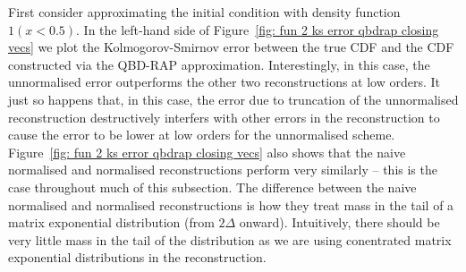 First consider approximating the initial condition with density function \(1(x<0.5)\). In the left-hand side of Figure~\ref{fig: fun 2 ks error qbdrap closing vecs} we plot the Kolmogorov-Smirnov error between the true CDF and the CDF constructed via the QBD-RAP approximation. Interestingly, in this case, the unnormalised error outperforms the other two reconstructions at low orders. It just so happens that, in this case, the error due to truncation of the unnormalised reconstruction destructively interfers with other errors in the reconstruction to cause the error to be lower at low orders for the unnormalised scheme. Figure~\ref{fig: fun 2 ks error qbdrap closing vecs} also shows that the naive normalised and normalised reconstructions perform very similarly -- this is the case throughout much of this subsection. The difference between the naive normalised and normalised reconstructions is how they treat mass in the tail of a matrix exponential distribution (from \(2\Delta\) onward). Intuitively, there should be very little mass in the tail of the distribution as we are using conentrated matrix exponential distributions in the reconstruction. 

